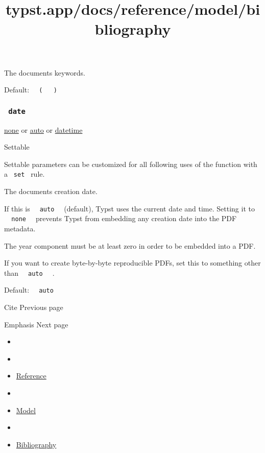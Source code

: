The document\textquotesingle s keywords.

Default:
\texttt{\ }{\texttt{\ (\ }}\texttt{\ }{\texttt{\ )\ }}\texttt{\ }

\subsubsection{\texorpdfstring{\texttt{\ date\ }}{ date }}\label{parameters-date}

\href{/docs/reference/foundations/none/}{none} {or}
\href{/docs/reference/foundations/auto/}{auto} {or}
\href{/docs/reference/foundations/datetime/}{datetime}

{{ Settable }}

\label{parameters-date-settable-tooltip}
Settable parameters can be customized for all following uses of the
function with a \texttt{\ set\ } rule.

The document\textquotesingle s creation date.

If this is \texttt{\ }{\texttt{\ auto\ }}\texttt{\ } (default), Typst
uses the current date and time. Setting it to
\texttt{\ }{\texttt{\ none\ }}\texttt{\ } prevents Typst from embedding
any creation date into the PDF metadata.

The year component must be at least zero in order to be embedded into a
PDF.

If you want to create byte-by-byte reproducible PDFs, set this to
something other than \texttt{\ }{\texttt{\ auto\ }}\texttt{\ } .

Default: \texttt{\ }{\texttt{\ auto\ }}\texttt{\ }

\href{/docs/reference/model/cite/}{\pandocbounded{}}

{ Cite } { Previous page }

\href{/docs/reference/model/emph/}{\pandocbounded{}}

{ Emphasis } { Next page }


\title{typst.app/docs/reference/model/bibliography}

\begin{itemize}
\tightlist
\item
  \href{/docs}{}
\item
  
\item
  \href{/docs/reference/}{Reference}
\item
  
\item
  \href{/docs/reference/model/}{Model}
\item
  
\item
  \href{/docs/reference/model/bibliography/}{Bibliography}
\end{itemize}

